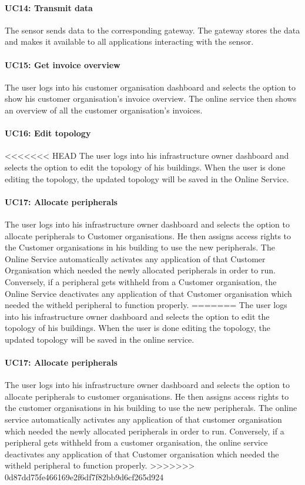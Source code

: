 \documentclass[english]{sareport}
\begin{document}
\paragraph{UC14: Transmit data}
The sensor sends data to the corresponding gateway. The gateway stores the data and makes it available to all applications interacting with the sensor.

\paragraph{UC15: Get invoice overview}
The user logs into his customer organisation dashboard and selects the option to show his customer organisation's invoice overview. The online service then shows an overview of all the customer organisation's invoices.

\paragraph{UC16: Edit topology}
<<<<<<< HEAD
The user logs into his infrastructure owner dashboard and selects the option to edit the topology of his buildings. When the user is done editing the topology, the updated topology will be saved in the Online Service.

\paragraph{UC17: Allocate peripherals}
The user logs into his infrastructure owner dashboard and selects the option to allocate peripherals to Customer organisations. He then assigns access rights to the Customer organisations in his building to use the new peripherals. The Online Service automatically activates any application of that Customer Organisation which needed the newly allocated peripherals in order to run. Conversely, if a peripheral gets withheld from a Customer organisation, the Online Service deactivates any application of that Customer organisation which needed the witheld peripheral to function properly.
=======
The user logs into his infrastructure owner dashboard and selects the option to edit the topology of his buildings. When the user is done editing the topology, the updated topology will be saved in the online service.

\paragraph{UC17: Allocate peripherals}
The user logs into his infrastructure owner dashboard and selects the option to allocate peripherals to customer organisations. He then assigns access rights to the customer organisations in his building to use the new peripherals. The online service automatically activates any application of that customer organisation which needed the newly allocated peripherals in order to run. Conversely, if a peripheral gets withheld from a customer organisation, the online service deactivates any application of that Customer organisation which needed the witheld peripheral to function properly.
>>>>>>> 0d87dd75fe466169e2f6df7f82bb9d6cf265d924
\end{document}
